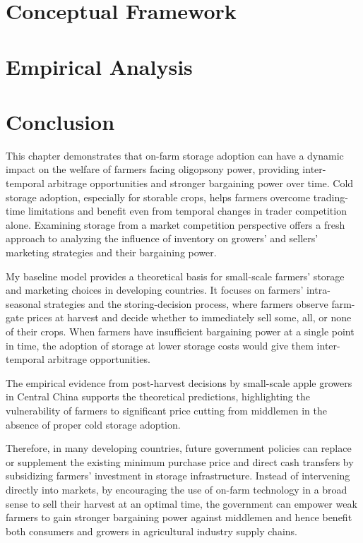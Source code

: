 \documentclass[12pt,authoryear, notitlepage]{elegantpaper}
\begin{document}
\section{Conceptual Framework}
    




\section{Empirical Analysis}


\section{Conclusion}
\noindent This chapter demonstrates that on-farm storage adoption can have a dynamic impact on the welfare of farmers facing oligopsony power, providing inter-temporal arbitrage opportunities and stronger bargaining power over time. Cold storage adoption, especially for storable crops, helps farmers overcome trading-time limitations and benefit even from temporal changes in trader competition alone. Examining storage from a market competition perspective offers a fresh approach to analyzing the influence of inventory on growers' and sellers' marketing strategies and their bargaining power.

My baseline model provides a theoretical basis for small-scale farmers' storage and marketing choices in developing countries. It focuses on farmers' intra-seasonal strategies and the storing-decision process, where farmers observe farm-gate prices at harvest and decide whether to immediately sell some, all, or none of their crops. When farmers have insufficient bargaining power at a single point in time, the adoption of storage at lower storage costs would give them inter-temporal arbitrage opportunities. 

The empirical evidence from post-harvest decisions by small-scale apple growers in Central China supports the theoretical predictions, highlighting the vulnerability of farmers to significant price cutting from middlemen in the absence of proper cold storage adoption. 

Therefore, in many developing countries, future government policies can replace or supplement the existing minimum purchase price and direct cash transfers by subsidizing farmers' investment in storage infrastructure. Instead of intervening directly into markets, by encouraging the use of on-farm technology in a broad sense to sell their harvest at an optimal time, the government can empower weak farmers to gain stronger bargaining power against middlemen and hence benefit both consumers and growers in agricultural industry supply chains.
\end{document}

